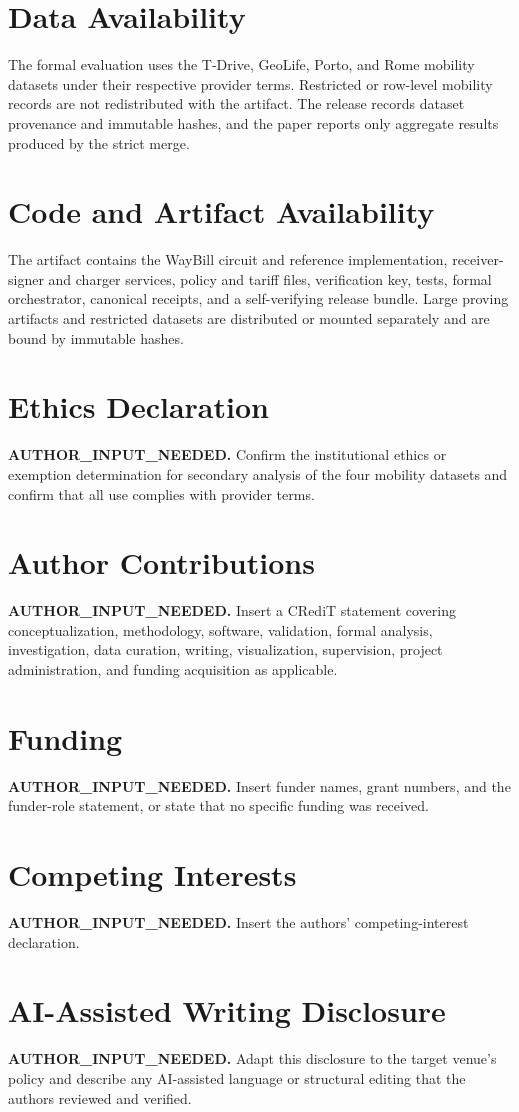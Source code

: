 
\section*{Data Availability}
The formal evaluation uses the T-Drive, GeoLife, Porto, and Rome mobility
datasets under their respective provider terms. Restricted or row-level
mobility records are not redistributed with the artifact. The release records
dataset provenance and immutable hashes, and the paper reports only aggregate
results produced by the strict merge.

\section*{Code and Artifact Availability}
The artifact contains the WayBill circuit and reference implementation,
receiver-signer and charger services, policy and tariff files, verification
key, tests, formal orchestrator, canonical receipts, and a self-verifying
release bundle. Large proving artifacts and restricted datasets are distributed
or mounted separately and are bound by immutable hashes.

\section*{Ethics Declaration}
\textbf{AUTHOR\_INPUT\_NEEDED.} Confirm the institutional ethics or exemption
determination for secondary analysis of the four mobility datasets and confirm
that all use complies with provider terms.

\section*{Author Contributions}
\textbf{AUTHOR\_INPUT\_NEEDED.} Insert a CRediT statement covering
conceptualization, methodology, software, validation, formal analysis,
investigation, data curation, writing, visualization, supervision, project
administration, and funding acquisition as applicable.

\section*{Funding}
\textbf{AUTHOR\_INPUT\_NEEDED.} Insert funder names, grant numbers, and the
funder-role statement, or state that no specific funding was received.

\section*{Competing Interests}
\textbf{AUTHOR\_INPUT\_NEEDED.} Insert the authors' competing-interest
declaration.

\section*{AI-Assisted Writing Disclosure}
\textbf{AUTHOR\_INPUT\_NEEDED.} Adapt this disclosure to the target venue's
policy and describe any AI-assisted language or structural editing that the
authors reviewed and verified.
